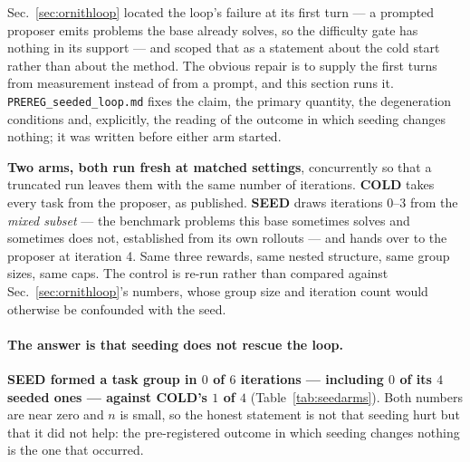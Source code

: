 Sec.~\ref{sec:ornithloop} located the loop's failure at its first turn --- a prompted proposer
emits problems the base already solves, so the difficulty gate has nothing in its support ---
and scoped that as a statement about the cold start rather than about the method. The obvious
repair is to supply the first turns from measurement instead of from a prompt, and this section
runs it. \texttt{PREREG\_seeded\_loop.md} fixes the claim, the primary quantity, the
degeneration conditions and, explicitly, the reading of the outcome in which seeding changes
nothing; it was written before either arm started.

\textbf{Two arms, both run fresh at matched settings}, concurrently so that a truncated run
leaves them with the same number of iterations. \textbf{COLD} takes every task from the
proposer, as published. \textbf{SEED} draws iterations 0--3 from the \emph{mixed subset} --- the
benchmark problems this base sometimes solves and sometimes does not, established from its own
rollouts --- and hands over to the proposer at iteration 4. Same three rewards, same nested
structure, same group sizes, same caps. The control is re-run rather than compared against
Sec.~\ref{sec:ornithloop}'s numbers, whose group size and iteration count would otherwise be
confounded with the seed.

\paragraph{The answer is that seeding does not rescue the loop.}
\textbf{SEED formed a task group in $0$ of $6$ iterations --- including $0$ of its $4$ seeded
ones --- against COLD's $1$ of $4$} (Table~\ref{tab:seedarms}). Both numbers are near zero and
$n$ is small, so the honest statement is not that seeding hurt but that it did not help: the
pre-registered outcome in which seeding changes nothing is the one that occurred.

